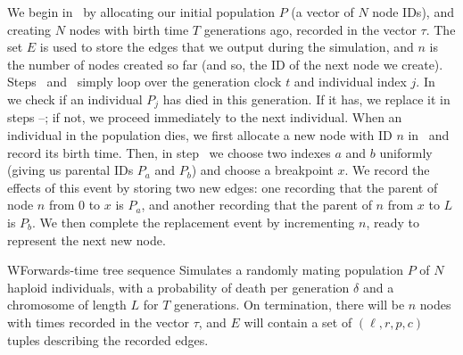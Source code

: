 \documentclass{article}
\begin{document}
We begin in~ by allocating our initial population $P$
(a vector of $N$ node IDs),
and creating $N$ nodes with birth time $T$ generations ago, recorded in the
vector $\tau$. The set $E$ is used to store the edges that we output during the
simulation, and $n$ is the number of nodes created so far (and so, the ID of
the next node we create). Steps~ and~ simply loop over
the generation clock $t$ and individual index $j$. In~ we check if
an individual $P_j$ has died in this generation. If it has, we replace it in
steps --; if not, we proceed immediately to the next
individual. When an individual in the population dies, we first allocate
a new node with ID $n$ in~ and record its birth time. Then,
in step~ we choose two indexes $a$ and $b$ uniformly (giving us
parental IDs $P_a$ and $P_b$) and choose a breakpoint $x$. We record the effects of this
event by storing two new edges: one recording that the parent of node $n$
from $0$ to $x$ is $P_a$, and another recording that the parent of $n$
from $x$ to $L$ is $P_b$. We then complete the replacement event by incrementing
$n$, ready to represent the next new node.

\begin{taocpalg}{W}{Forwards-time tree sequence}
{Simulates a randomly mating population $P$ of $N$ haploid individuals,
with a probability of death per generation $\delta$ and a chromosome of length
$L$ for $T$ generations. On termination, there will be $n$ nodes with times recorded
in the vector $\tau$, and $E$ will contain a set of $(\ell, r, p, c)$ tuples
describing the recorded edges.
}




\algstep{W4.}{Mortality.}{ If $\randomuniform([0, 1)) \geq \delta$ go to \algref{W9}.
}


\algstep{W6.}{Choose parents.}{Set $a \leftarrow \randomuniform(\{0, \dots, N - 1\})$,
    $b \leftarrow \randomuniform(\{0, \dots, N - 1\})$ and $x \leftarrow \randomuniform([0, L))$.
}




\end{taocpalg}
\end{document}
